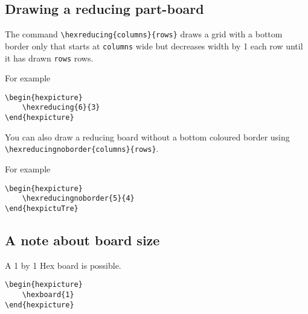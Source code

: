 \documentclass[a4paper,12pt]{article}
\begin{document}
    \begin{hexpicture}
    \end{hexpicture}
    
    \subsection{Drawing a reducing part-board}
    
    The command \verb|\hexreducing{columns}{rows}| draws a grid with a bottom border only that starts at \verb|columns| wide but decreases width by 1 each row until it has drawn \verb|rows| rows. 
    
    For example
    
    \begin{verbatim}\begin{hexpicture}
    \hexreducing{6}{3}
\end{hexpicture}\end{verbatim}
    
    \begin{hexpicture}
    \end{hexpicture}

    You can also draw a reducing board without a bottom coloured border using\\
    \verb|\hexreducingnoborder{columns}{rows}|.

    For example
    
    \begin{verbatim}\begin{hexpicture}
    \hexreducingnoborder{5}{4}
\end{hexpictuTre}\end{verbatim}
    
    \begin{hexpicture}
    \end{hexpicture}
    
    \subsection{A note about board size}
    
    A 1 by 1 Hex board is possible.
    
    \begin{verbatim}\begin{hexpicture}
    \hexboard{1}
\end{hexpicture}\end{verbatim}
    
\end{document}
